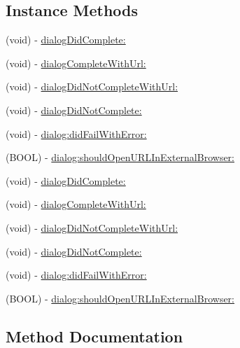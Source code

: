 \subsection*{Instance Methods}
\begin{DoxyCompactItemize}
\item 
(void) -\/ \hyperlink{protocolFBDialogDelegate_01-p_ae02e1e3a83b2b65e324448da64766706}{dialog\+Did\+Complete\+:}
\item 
(void) -\/ \hyperlink{protocolFBDialogDelegate_01-p_acc841de7a1c7fd57e4447abd9ffbb3ee}{dialog\+Complete\+With\+Url\+:}
\item 
(void) -\/ \hyperlink{protocolFBDialogDelegate_01-p_ae7fe5c8835467a4dd9b3cb5513991568}{dialog\+Did\+Not\+Complete\+With\+Url\+:}
\item 
(void) -\/ \hyperlink{protocolFBDialogDelegate_01-p_a0198ffe12617cb25742d9aea1aaa4526}{dialog\+Did\+Not\+Complete\+:}
\item 
(void) -\/ \hyperlink{protocolFBDialogDelegate_01-p_a1fa3ec6ea42721d5025b6371d00704ff}{dialog\+:did\+Fail\+With\+Error\+:}
\item 
(B\+O\+OL) -\/ \hyperlink{protocolFBDialogDelegate_01-p_aa560b9b9075a46eeeb61c6e951e7a17b}{dialog\+:should\+Open\+U\+R\+L\+In\+External\+Browser\+:}
\item 
(void) -\/ \hyperlink{protocolFBDialogDelegate_01-p_ae02e1e3a83b2b65e324448da64766706}{dialog\+Did\+Complete\+:}
\item 
(void) -\/ \hyperlink{protocolFBDialogDelegate_01-p_acc841de7a1c7fd57e4447abd9ffbb3ee}{dialog\+Complete\+With\+Url\+:}
\item 
(void) -\/ \hyperlink{protocolFBDialogDelegate_01-p_ae7fe5c8835467a4dd9b3cb5513991568}{dialog\+Did\+Not\+Complete\+With\+Url\+:}
\item 
(void) -\/ \hyperlink{protocolFBDialogDelegate_01-p_a0198ffe12617cb25742d9aea1aaa4526}{dialog\+Did\+Not\+Complete\+:}
\item 
(void) -\/ \hyperlink{protocolFBDialogDelegate_01-p_a1fa3ec6ea42721d5025b6371d00704ff}{dialog\+:did\+Fail\+With\+Error\+:}
\item 
(B\+O\+OL) -\/ \hyperlink{protocolFBDialogDelegate_01-p_aa560b9b9075a46eeeb61c6e951e7a17b}{dialog\+:should\+Open\+U\+R\+L\+In\+External\+Browser\+:}
\end{DoxyCompactItemize}


\subsection{Method Documentation}
\mbox{\label{protocolFBDialogDelegate_01-p_a1fa3ec6ea42721d5025b6371d00704ff}} 

